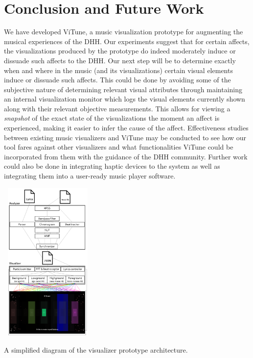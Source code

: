 \documentclass{sigchi-ext}
\begin{document}
\section{Conclusion and Future Work}
We have developed ViTune, a music visualization prototype for augmenting the musical experiences of the DHH. Our experiments suggest that for certain affects, the visualizations produced by the prototype do indeed moderately induce or dissuade such affects to the DHH. Our next step will be to determine exactly when and where in the music (and its visualizations) certain visual elements induce or dissuade such affects. This could be done by avoiding some of the subjective nature of determining relevant visual attributes through maintaining an internal visualization monitor which logs the visual elements currently shown along with their relevant objective measurements. This allows for viewing a \textit{snapshot} of the exact state of the visualizations the moment an affect is experienced, making it easier to infer the cause of the affect. Effectiveness studies between existing music visualizers and ViTune may be conducted to see how our tool fares against other visualizers and what functionalities ViTune could be incorporated from them with the guidance of the DHH community. Further work could also be done in integrating haptic devices to the system as well as integrating them into a user-ready music player software.

\begin{marginfigure}[-35pc]
\begin{minipage}{\marginparwidth}
     \includegraphics[width=4.75cm,height=8cm]{figures/ArchitectureLBW.png}
    \caption{A simplified diagram of the visualizer prototype architecture.}
    \label{fig:architecture}
    \end{minipage}
\end{marginfigure}
\end{document}
